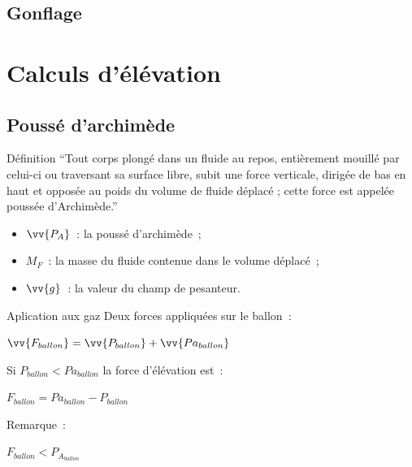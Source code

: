 \documentclass{beamer}
\begin{document}
\subsection{Gonflage}

\section{Calculs d'élévation}

\subsection{Poussé d'archimède}

\begin{frame}{Définition}
  \enquote{Tout corps plongé dans un fluide au repos, entièrement mouillé par celui-ci ou traversant sa surface libre, subit une force verticale, dirigée de bas en haut et opposée au poids du volume de fluide déplacé ; cette force est appelée poussée d'Archimède.}
  \bigbreak
  \begin{center}
  \end{center}
  \begin{itemize}
    \item $\vv{P_A}$~: la poussé d'archimède~;
    \item $M_F$~: la masse du fluide contenue dans le volume déplacé~;
    \item $\vv{g}$~: la valeur du champ de pesanteur.
  \end{itemize}
\end{frame}

\begin{frame}{Aplication aux gaz}
  Deux forces appliquées sur le ballon~: \\
  \begin{center}
    $\displaystyle{\vv{F_{ballon}} = \vv{P_{ballon}} + \vv{Pa_{ballon}}}$ \\
  \end{center}
  Si $P_{ballon} < Pa_{ballon}$ la force d'élévation est~:
  \begin{center}
    $\displaystyle{F_{ballon} = Pa_{ballon} - P_{ballon}}$ \\
  \end{center}
  Remarque~:\\
  \begin{center}
    $F_{ballon} < P_{A_{ballon}}$
  \end{center}
\end{frame}
\end{document}

